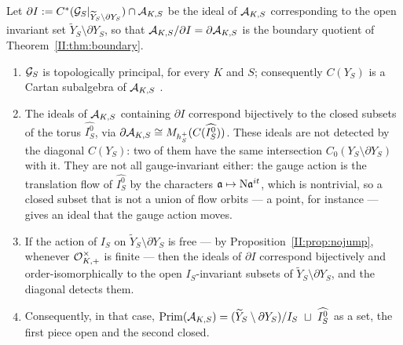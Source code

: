 \begin{theorem}\label{II:thm:principal}
Let $\partial I:=C^*(\mathcal{G}_S|_{\widetilde Y_S\setminus\partial Y_S})\cap\mathcal{A}_{K,S}$ be the ideal of
$\mathcal{A}_{K,S}$ corresponding to the open invariant set $\widetilde Y_S\setminus\partial Y_S$, so
that $\mathcal{A}_{K,S}/\partial I=\partial\mathcal{A}_{K,S}$ is the boundary quotient of
Theorem~\ref{II:thm:boundary}.
\begin{enumerate}
\item $\mathcal{G}_S$ is topologically principal, for every $K$ and $S$; consequently $C(Y_S)$ is a
Cartan subalgebra of $\mathcal{A}_{K,S}$ \cite{Renault08}.
\item The ideals of $\mathcal{A}_{K,S}$ containing $\partial I$ correspond bijectively to the closed
subsets of the torus $\widehat{I_S^0}$, via
$\partial\mathcal{A}_{K,S}\cong M_{h^+_S}(C(\widehat{I_S^0}))$. These ideals are not detected by the
diagonal $C(Y_S)$: two of them have the same intersection $C_0(Y_S\setminus\partial Y_S)$
with it. They are not all gauge-invariant either: the gauge action is the translation flow
of $\widehat{I_S^0}$ by the characters $\mathfrak{a}\mapsto\mathrm{N}\mathfrak{a}^{it}$, which is nontrivial, so
a closed subset that is not a union of flow orbits --- a point, for instance --- gives an
ideal that the gauge action moves.
\item If the action of $I_S$ on $\widetilde Y_S\setminus\partial Y_S$ is free --- by
Proposition~\ref{II:prop:nojump}, whenever $\mathcal{O}^\times_{K,+}$ is finite --- then the ideals of
$\partial I$ correspond bijectively and order-isomorphically to the open $I_S$-invariant
subsets of $\widetilde Y_S\setminus\partial Y_S$, and the diagonal detects them.
\item Consequently, in that case,
$\operatorname{Prim}(\mathcal{A}_{K,S})=(\widetilde Y_S\setminus\partial Y_S)/I_S\ \sqcup\ \widehat{I_S^0}$
as a set, the first piece open and the second closed.
\end{enumerate}
\end{theorem}

